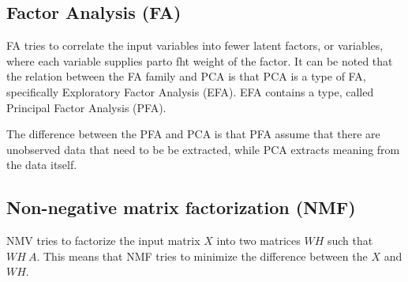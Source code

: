 \begin{comment}
    @misc{LVD,
          organization = {Tilburg centre for Creative Computing},
          url          = {https://lvdmaaten.github.io/publications/papers/TR\_Dimensionality\_Reduction\_Review\_2009.pdf},
          title        = {Dimensionality Reduction: A Comparative Review},
          author       = {Laurens van der Maaten, Eric Postma, Jaap van Henrik},
          urldate      = {2009-10-26}
        }
\end{comment}
    

\subsection*{Factor Analysis (FA)}
FA tries to correlate the input variables into fewer latent factors, or variables, where each variable supplies parto fht weight of the factor. It can be noted that the relation between the FA family and PCA is that PCA is a type of FA, specifically Exploratory Factor Analysis (EFA). EFA contains a type, called Principal Factor Analysis (PFA).

The difference between the PFA and PCA is that PFA assume that there are unobserved data that need to be be extracted, while PCA extracts meaning from the data itself.\cite{FA}


\begin{comment}
@misc{FA,
      organization = {Advanced Research Computing Statistical Methods and Data Analytics},
      url          = {https://stats.oarc.ucla.edu/spss/seminars/introduction-to-factor-analysis/a-practical-introduction-to-factor-analysis/},
      title        = {A PRACTICAL INTRODUCTION TO FACTOR ANALYSIS: EXPLORATORY FACTOR ANALYSIS},
      urldate      = {2022-10-11}
    }
\end{comment}

\subsection*{Non-negative matrix factorization (NMF)}
NMV tries to factorize the input matrix $X$ into two matrices $WH$ such that $WH ~ A$. This means that NMF tries to minimize the difference between the $X$ and $WH$. \cite{NMF}

\begin{comment}
@misc{NMF,
  organization = {the morning paper},
  url          = {https://blog.acolyer.org/2019/02/18/the-why-and-how-of-nonnegative-matrix-factorization/},
  title        = {The why and how of nonnegative matrix factorization},
  author       = {Adrian Colyer},
  urldate      = {2019-02-18}
}
\end{comment} 

